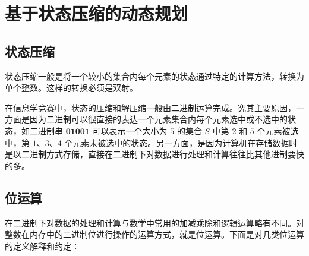 
\chapter{基于状态压缩的动态规划}

\section{状态压缩}

状态压缩一般是将一个较小的集合内每个元素的状态通过特定的计算方法，转换为单个整数。这样的转换必须是双射。

在信息学竞赛中，状态的压缩和解压缩一般由二进制运算完成。究其主要原因，一方面是因为二进制可以很直接的表达一个元素集合内每个元素选中或不选中的状态，如二进制串
\(\mathbf{01001}\) 可以表示一个大小为 \(5\) 的集合 \(S\) 中第 \(2\) 和
\(5\) 个元素被选中，第 \(1\)、\(3\)、\(4\)
个元素未被选中的状态。另一方面，是因为计算机在存储数据时是以二进制方式存储，直接在二进制下对数据进行处理和计算往往比其他进制要快的多。

\section{位运算}

在二进制下对数据的处理和计算与数学中常用的加减乘除和逻辑运算略有不同。对整数在内存中的二进制位进行操作的运算方式，就是位运算。下面是对几类位运算的定义解释和约定：

